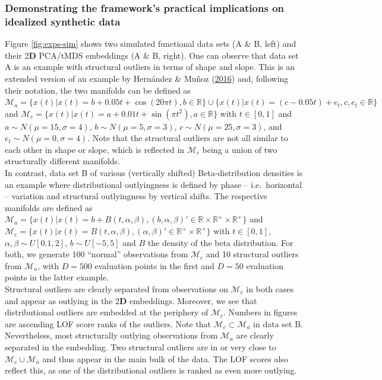 \documentclass[
  10pt]{article}
\newcommand{\vizdim}{\mathbf{D}}        %
\newcommand{\obsdim}{\ensuremath{D}}    %
\newcommand{\co}{c}
\newcommand{\an}{a}
\newcommand{\Min}{\mathcal{M}_{\co}}
\newcommand{\Man}{\mathcal{M}_{\an}}
\begin{document}
\subsubsection{Demonstrating the framework's practical implications on idealized synthetic data}

Figure \ref{fig:exps-sim} shows two simulated functional data sets (A \& B, left) and their 2\(\vizdim\) PCA/tMDS embeddings (A \& B, right). One can observe that data set A is an example with structural outliers in terms of shape and slope. This is an extended version of an example by Hernández \& Muñoz (\protect\hyperlink{ref-hernandez2106kernel}{2016}) and, following their notation, the two manifolds can be defined as \(\Man = \{x(t) \vert x(t) = b + 0.05t + \cos(20\pi t), b \in \mathbb R\} \cup \{x(t) \vert x(t) = (c - 0.05t) + e_t, c, e_t \in \mathbb R\}\) and \(\Min = \{x(t) \vert x(t) = a + 0.01t + \sin(\pi t^2), a \in \mathbb R\}\) with \(t \in [0, 1]\) and \(a \sim N(\mu = 15, \sigma = 4)\), \(b \sim N(\mu = 5, \sigma = 3)\), \(c \sim N(\mu = 25, \sigma = 3)\), and \(e_t \sim N(\mu = 0, \sigma = 4)\). Note that the structural outliers are not all similar to each other in shape or slope, which is reflected in \(\Min\) being a union of two structurally different manifolds.\\
In contrast, data set B of various (vertically shifted) Beta-distribution densities is an example where distributional outlyingness is defined by phase -- i.e.~horizontal -- variation and structural outlyingness by vertical shifts. The respective manifolds are defined as \(\Man = \{x(t) \vert x(t) = b + B(t, \alpha, \beta), (b, \alpha, \beta)' \in \mathbb R \times \mathbb R^+ \times \mathbb R^+\}\) and \(\Min = \{x(t) \vert x(t) = B(t, \alpha, \beta), (\alpha, \beta)' \in \mathbb R^+ \times \mathbb R^+\}\) with \(t \in [0, 1]\), \(\alpha, \beta \sim U[0.1, 2]\), \(b \sim U[-5, 5]\) and \(B\) the density of the beta distribution. For both, we generate 100 ``normal'' observations from \(\Min\) and 10 structural outliers from \(\Man\), with \(\obsdim = 500\) evaluation points in the first and \(\obsdim = 50\) evaluation points in the latter example.\\
Structural outliers are clearly separated from observations on \(\Min\) in both cases and appear as outlying in the 2\(\vizdim\) embeddings. Moreover, we see that distributional outliers are embedded at the periphery of \(\Min\). Numbers in figures are ascending LOF score ranks of the outliers. Note that \(\Min \subset \Man\) in data set B. Nevertheless, most structurally outlying observations from \(\Man\) are clearly separated in the embedding. Two structural outliers are in or very close to \(\Min \cup \Man\) and thus appear in the main bulk of the data. The LOF scores also reflect this, as one of the distributional outliers is ranked as even more outlying.
\end{document}
